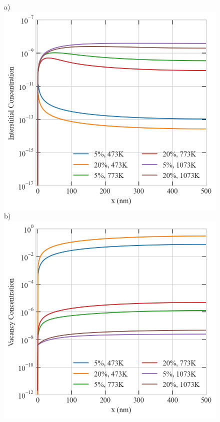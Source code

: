 \documentclass[utf8]{frontiersSCNS} %
\begin{document}
    \begin{figure}[h!]  %
        \centering
        a)\includegraphics[scale=0.55]{srrt/plots/Fig15_a.png}
        b)\includegraphics[scale=0.55]{srrt/plots/Fig15_b.png}

\end{figure}
\end{document}
